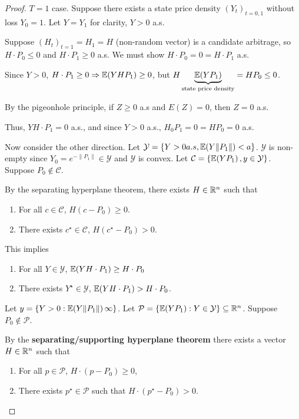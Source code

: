 \begin{proof}
  $T = 1$ case.  Suppose there exists a state price density
  $(Y_{t})_{t = 0, 1}$ without loss $Y_{0} = 1$.  Let $Y = Y_{1}$ for
  clarity, $Y > 0$ a.s.

  Suppose $(H_{t})_{t = 1} = H_{1} = H$ (non-random vector) is a
  candidate arbitrage, so $H \cdot P_{0} \leq 0$ and $H \cdot P_{1}
  \geq 0$ a.s.  We must show $H \cdot P_{0} = 0 = H \cdot P_{1}$ a.s.

  Since $Y > 0$, $H \cdot P_{1} \geq 0 \Rightarrow \E{Y H P_{1}} \geq
    0$, but $H \underbrace{\E{Y P_{1}}}_{\text{state price density}} =
    H P_{0} \leq 0$.

  By the pigeonhole principle, if $Z \geq 0$ a.s and $E(Z) = 0$, then
  $Z = 0$ a.s.

  Thus, $Y H \cdot P_{1} = 0$ a.s., and since $Y > 0$ a.s., $H_{0}
  P_{1} = 0 = H P_{0} = 0$ a.s.

  Now consider the other direction.  Let $\mathcal{Y} = \{ Y > 0 a.s,
  \E{Y \| P_{1} \|} < a \}$.  $\mathcal{Y}$ is non-empty since $Y_{0}
  = e^{-\| P_{1} \|} \in \mathcal{Y}$ and $\mathcal{Y}$ is convex.
  Let $\mathcal{C} = \{ \E{YP_{1}}, y \in \mathcal{Y} \}$.  Suppose
  $P_{0} \notin \mathcal{C}$.

  By the separating hyperplane theorem, there exists $H \in \mathbb{R}^{n}$ such
  that
  \begin{enumerate}
  \item For all $c \in \mathcal{C}$, $H(c - P_{0}) \geq 0$.
  \item There exists $c^{\star} \in \mathcal{C}$, $H(c^{\star} - P_{0}) > 0$.
  \end{enumerate}

  This implies
  \begin{enumerate}
  \item For all $Y \in \mathcal{Y}$, $\E{YH \cdot P_{1}} \geq H \cdot
    P_{0}$
  \item There exists $Y^{\star} \in \mathcal{Y}$, $\E{Y H \cdot P_{1}} > H
    \cdot P_{0}$.
  \end{enumerate}

  Let $y = \{ Y > 0: \E{Y \| P_{1} \|} \infty \}$.  Let $\mathcal{P} =
  \{ \E{YP_{1}} : Y \in \mathcal{Y} \} \subseteq \R^{n}$. Suppose
  $P_{0} \notin \mathcal{P}$.

  By the \textbf{separating/supporting hyperplane theorem} there
  exists a vector $H \in \mathbb{R}^{n}$ such that
  \begin{enumerate}
  \item For all $p \in \mathcal{P}$, $H \cdot (p - P_{0}) \geq 0$,
  \item There exists $p^{\star} \in \mathcal{P}$ such that $H \cdot
    (p^{\star} - P_{0}) > 0$.
  \end{enumerate}


\end{proof}
